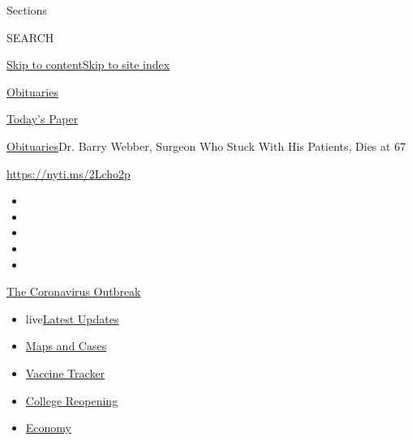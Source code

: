 Sections

SEARCH

\protect\hyperlink{site-content}{Skip to
content}\protect\hyperlink{site-index}{Skip to site index}

\href{https://www.nytimes.com/section/obituaries}{Obituaries}

\href{https://myaccount.nytimes.com/auth/login?response_type=cookie\&client_id=vi}{}

\href{https://www.nytimes.com/section/todayspaper}{Today's Paper}

\href{/section/obituaries}{Obituaries}\textbar{}Dr. Barry Webber,
Surgeon Who Stuck With His Patients, Dies at 67

\url{https://nyti.ms/2Lcho2p}

\begin{itemize}
\item
\item
\item
\item
\item
\end{itemize}

\href{https://www.nytimes.com/news-event/coronavirus?action=click\&pgtype=Article\&state=default\&region=TOP_BANNER\&context=storylines_menu}{The
Coronavirus Outbreak}

\begin{itemize}
\tightlist
\item
  live\href{https://www.nytimes.com/2020/08/03/world/coronavirus-covid-19.html?action=click\&pgtype=Article\&state=default\&region=TOP_BANNER\&context=storylines_menu}{Latest
  Updates}
\item
  \href{https://www.nytimes.com/interactive/2020/us/coronavirus-us-cases.html?action=click\&pgtype=Article\&state=default\&region=TOP_BANNER\&context=storylines_menu}{Maps
  and Cases}
\item
  \href{https://www.nytimes.com/interactive/2020/science/coronavirus-vaccine-tracker.html?action=click\&pgtype=Article\&state=default\&region=TOP_BANNER\&context=storylines_menu}{Vaccine
  Tracker}
\item
  \href{https://www.nytimes.com/2020/08/02/us/covid-college-reopening.html?action=click\&pgtype=Article\&state=default\&region=TOP_BANNER\&context=storylines_menu}{College
  Reopening}
\item
  \href{https://www.nytimes.com/live/2020/08/03/business/stock-market-today-coronavirus?action=click\&pgtype=Article\&state=default\&region=TOP_BANNER\&context=storylines_menu}{Economy}
\end{itemize}

